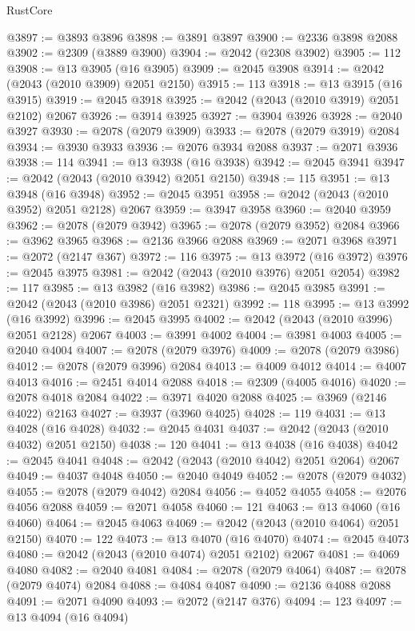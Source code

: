 \begin{lexlean}{RustCore}
\begin{coremodule}
@3897 := @3893 @3896
@3898 := @3891 @3897
@3900 := @2336 @3898 @2088
@3902 := @2309 (@3889 @3900)
@3904 := @2042 (@2308 @3902)
@3905 := 112
@3908 := @13 @3905 (@16 @3905)
@3909 := @2045 @3908
@3914 := @2042 (@2043 (@2010 @3909) @2051 @2150)
@3915 := 113
@3918 := @13 @3915 (@16 @3915)
@3919 := @2045 @3918
@3925 := @2042 (@2043 (@2010 @3919) @2051 @2102) @2067
@3926 := @3914 @3925
@3927 := @3904 @3926
@3928 := @2040 @3927
@3930 := @2078 (@2079 @3909)
@3933 := @2078 (@2079 @3919) @2084
@3934 := @3930 @3933
@3936 := @2076 @3934 @2088
@3937 := @2071 @3936
@3938 := 114
@3941 := @13 @3938 (@16 @3938)
@3942 := @2045 @3941
@3947 := @2042 (@2043 (@2010 @3942) @2051 @2150)
@3948 := 115
@3951 := @13 @3948 (@16 @3948)
@3952 := @2045 @3951
@3958 := @2042 (@2043 (@2010 @3952) @2051 @2128) @2067
@3959 := @3947 @3958
@3960 := @2040 @3959
@3962 := @2078 (@2079 @3942)
@3965 := @2078 (@2079 @3952) @2084
@3966 := @3962 @3965
@3968 := @2136 @3966 @2088
@3969 := @2071 @3968
@3971 := @2072 (@2147 @367)
@3972 := 116
@3975 := @13 @3972 (@16 @3972)
@3976 := @2045 @3975
@3981 := @2042 (@2043 (@2010 @3976) @2051 @2054)
@3982 := 117
@3985 := @13 @3982 (@16 @3982)
@3986 := @2045 @3985
@3991 := @2042 (@2043 (@2010 @3986) @2051 @2321)
@3992 := 118
@3995 := @13 @3992 (@16 @3992)
@3996 := @2045 @3995
@4002 := @2042 (@2043 (@2010 @3996) @2051 @2128) @2067
@4003 := @3991 @4002
@4004 := @3981 @4003
@4005 := @2040 @4004
@4007 := @2078 (@2079 @3976)
@4009 := @2078 (@2079 @3986)
@4012 := @2078 (@2079 @3996) @2084
@4013 := @4009 @4012
@4014 := @4007 @4013
@4016 := @2451 @4014 @2088
@4018 := @2309 (@4005 @4016)
@4020 := @2078 @4018 @2084
@4022 := @3971 @4020 @2088
@4025 := @3969 (@2146 @4022) @2163
@4027 := @3937 (@3960 @4025)
@4028 := 119
@4031 := @13 @4028 (@16 @4028)
@4032 := @2045 @4031
@4037 := @2042 (@2043 (@2010 @4032) @2051 @2150)
@4038 := 120
@4041 := @13 @4038 (@16 @4038)
@4042 := @2045 @4041
@4048 := @2042 (@2043 (@2010 @4042) @2051 @2064) @2067
@4049 := @4037 @4048
@4050 := @2040 @4049
@4052 := @2078 (@2079 @4032)
@4055 := @2078 (@2079 @4042) @2084
@4056 := @4052 @4055
@4058 := @2076 @4056 @2088
@4059 := @2071 @4058
@4060 := 121
@4063 := @13 @4060 (@16 @4060)
@4064 := @2045 @4063
@4069 := @2042 (@2043 (@2010 @4064) @2051 @2150)
@4070 := 122
@4073 := @13 @4070 (@16 @4070)
@4074 := @2045 @4073
@4080 := @2042 (@2043 (@2010 @4074) @2051 @2102) @2067
@4081 := @4069 @4080
@4082 := @2040 @4081
@4084 := @2078 (@2079 @4064)
@4087 := @2078 (@2079 @4074) @2084
@4088 := @4084 @4087
@4090 := @2136 @4088 @2088
@4091 := @2071 @4090
@4093 := @2072 (@2147 @376)
@4094 := 123
@4097 := @13 @4094 (@16 @4094)

\end{coremodule}
\end{lexlean}
